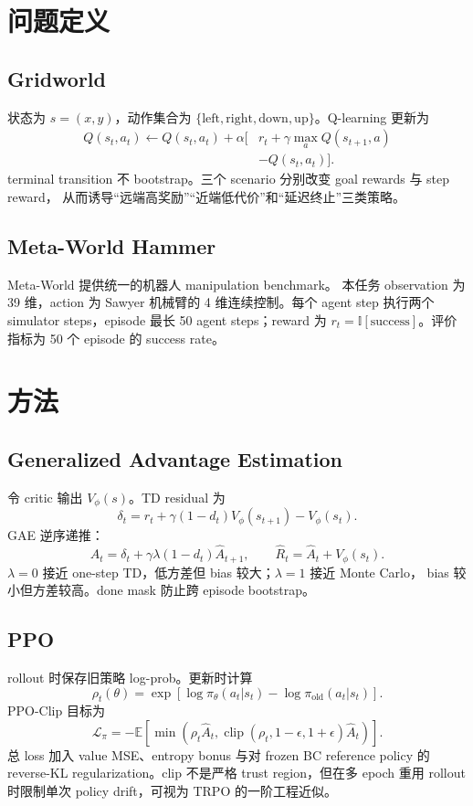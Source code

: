 \documentclass[10pt,twocolumn,a4paper]{ctexart}
\begin{document}
\section{问题定义}
\subsection{Gridworld}
状态为 $s=(x,y)$，动作集合为
$\{\mathrm{left,right,down,up}\}$。Q-learning 更新为
\[
\begin{aligned}
Q(s_t,a_t)\leftarrow Q(s_t,a_t)+\alpha\big[
&r_t+\gamma\max_aQ(s_{t+1},a)\\
&-Q(s_t,a_t)\big].
\end{aligned}
\]
terminal transition 不 bootstrap。三个 scenario 分别改变 goal rewards 与 step reward，
从而诱导“远端高奖励”“近端低代价”和“延迟终止”三类策略。

\subsection{Meta-World Hammer}
Meta-World 提供统一的机器人 manipulation benchmark\citep{yu2020metaworld}。
本任务 observation 为 39 维，action 为 Sawyer 机械臂的 4 维连续控制。每个 agent step
执行两个 simulator steps，episode 最长 50 agent steps；reward 为
$r_t=\mathbb I[\mathrm{success}]$。评价指标为 50 个 episode 的 success rate。

\section{方法}
\subsection{Generalized Advantage Estimation}
令 critic 输出 $V_\phi(s)$。TD residual 为
\[
\delta_t=r_t+\gamma(1-d_t)V_\phi(s_{t+1})-V_\phi(s_t).
\]
GAE 逆序递推\citep{schulman2016gae}：
\[
\hat A_t=\delta_t+\gamma\lambda(1-d_t)\hat A_{t+1},\qquad
\hat R_t=\hat A_t+V_\phi(s_t).
\]
$\lambda=0$ 接近 one-step TD，低方差但 bias 较大；$\lambda=1$ 接近 Monte Carlo，
bias 较小但方差较高。done mask 防止跨 episode bootstrap。

\subsection{PPO}
rollout 时保存旧策略 log-prob。更新时计算
\[
\rho_t(\theta)=\exp\left[
\log\pi_\theta(a_t|s_t)-\log\pi_{\mathrm{old}}(a_t|s_t)
\right].
\]
PPO-Clip 目标为
\[
\mathcal L_{\pi}=-\mathbb E\left[
\min\left(\rho_t\hat A_t,
\operatorname{clip}(\rho_t,1-\epsilon,1+\epsilon)\hat A_t\right)
\right].
\]
总 loss 加入 value MSE、entropy bonus 与对 frozen BC reference policy 的 reverse-KL
regularization。clip 不是严格 trust region，但在多 epoch 重用 rollout 时限制单次
policy drift，可视为 TRPO 的一阶工程近似\citep{schulman2015trpo,schulman2017ppo}。
\end{document}
